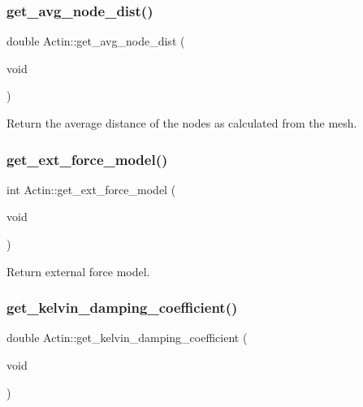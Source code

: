 \mbox{\label{classActin_ac003b972790cb2209bacabe7106ecdcb}} 
\subsubsection{\texorpdfstring{get\_avg\_node\_dist()}{get\_avg\_node\_dist()}}
{\footnotesize\ttfamily double Actin\+::get\+\_\+avg\+\_\+node\+\_\+dist (\begin{DoxyParamCaption}\item[{void}]{ }\end{DoxyParamCaption})\hspace{0.3cm}{\ttfamily [inline]}}

Return the average distance of the nodes as calculated from the mesh. \mbox{\label{classActin_a5a1b2a81b2b6693425a01394428c1a78}} 
\subsubsection{\texorpdfstring{get\_ext\_force\_model()}{get\_ext\_force\_model()}}
{\footnotesize\ttfamily int Actin\+::get\+\_\+ext\+\_\+force\+\_\+model (\begin{DoxyParamCaption}\item[{void}]{ }\end{DoxyParamCaption})\hspace{0.3cm}{\ttfamily [inline]}}

Return external force model. \mbox{\label{classActin_a5a2d7e5b5f6cc97bedc5fe46bd18e4c8}} 
\subsubsection{\texorpdfstring{get\_kelvin\_damping\_coefficient()}{get\_kelvin\_damping\_coefficient()}}
{\footnotesize\ttfamily double Actin\+::get\+\_\+kelvin\+\_\+damping\+\_\+coefficient (\begin{DoxyParamCaption}\item[{void}]{ }\end{DoxyParamCaption})\hspace{0.3cm}{\ttfamily [inline]}}

